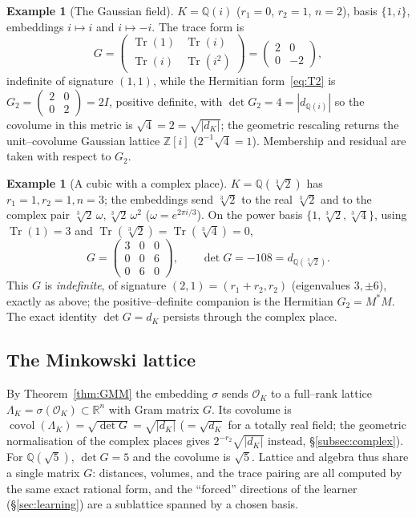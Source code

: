 \documentclass[11pt]{article}
\theoremstyle{plain}
\theoremstyle{definition}
\newtheorem{example}[theorem]{Example}
\theoremstyle{remark}
\newcommand{\Q}{\mathbb{Q}}
\newcommand{\Z}{\mathbb{Z}}
\newcommand{\R}{\mathbb{R}}
\newcommand{\K}{K}
\newcommand{\OK}{\mathcal{O}_K}
\newcommand{\Tr}{\operatorname{Tr}}
\newcommand{\GG}{G}
\begin{document}
\begin{example}[The Gaussian field]\label{ex:gaussint}
$\K=\Q(i)$ ($r_1=0$, $r_2=1$, $n=2$), basis $\{1,i\}$, embeddings $i\mapsto i$ and $i\mapsto-i$. The trace
form is
\[
  \GG=\begin{pmatrix}\Tr(1)&\Tr(i)\\\Tr(i)&\Tr(i^2)\end{pmatrix}=\begin{pmatrix}2&0\\0&-2\end{pmatrix},
\]
indefinite of signature $(1,1)$, while the Hermitian form~\eqref{eq:T2} is
$G_2=\left(\begin{smallmatrix}2&0\\0&2\end{smallmatrix}\right)=2I$, positive definite, with $\det G_2=4=|d_{\Q(i)}|$
so the covolume in this metric is $\sqrt4=2=\sqrt{|d_\K|}$; the geometric rescaling returns the
unit--covolume Gaussian lattice $\Z[i]$ ($2^{-1}\sqrt4=1$). Membership and residual are taken with respect to
$G_2$.
\end{example}

\begin{example}[A cubic with a complex place]\label{ex:cubic2}
$\K=\Q(\sqrt[3]2)$ has $r_1=1,r_2=1,n=3$; the embeddings send $\sqrt[3]2$ to the real $\sqrt[3]2$ and to the
complex pair $\sqrt[3]2\,\omega,\sqrt[3]2\,\omega^2$ ($\omega=e^{2\pi i/3}$). On the power basis
$\{1,\sqrt[3]2,\sqrt[3]4\}$, using $\Tr(1)=3$ and $\Tr(\sqrt[3]2)=\Tr(\sqrt[3]4)=0$,
\[
  \GG=\begin{pmatrix}3&0&0\\0&0&6\\0&6&0\end{pmatrix},\qquad \det\GG=-108=d_{\Q(\sqrt[3]2)} .
\]
This $\GG$ is \emph{indefinite}, of signature $(2,1)=(r_1+r_2,r_2)$ (eigenvalues $3,\pm6$), exactly as
above; the positive--definite companion is the Hermitian $G_2=M^{*}M$. The exact identity $\det\GG=d_\K$
persists through the complex place.
\end{example}

\subsection{The Minkowski lattice}\label{subsec:lattice}
By Theorem~\ref{thm:GMM} the embedding $\sigma$ sends $\OK$ to a full--rank lattice
$\Lambda_\K=\sigma(\OK)\subset\R^n$ with Gram matrix $\GG$. Its covolume is
$\operatorname{covol}(\Lambda_\K)=\sqrt{\det\GG}=\sqrt{|d_\K|}$ ($=\sqrt{d_\K}$ for a totally real field; the
geometric normalisation of the complex places gives $2^{-r_2}\sqrt{|d_\K|}$ instead, \S\ref{subsec:complex}).
For $\Q(\sqrt5)$, $\det\GG=5$ and the covolume is $\sqrt5$. Lattice and algebra thus share a
single matrix $\GG$: distances, volumes, and the trace pairing are all computed by the same exact rational
form, and the ``forced'' directions of the learner (\S\ref{sec:learning}) are a sublattice spanned by a
chosen basis.
\end{document}
